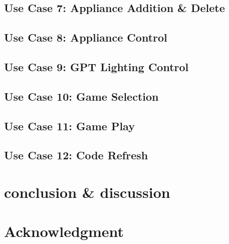 \documentclass[conference]{IEEEtran}
\begin{document}
    \subsection{Use Case 7: Appliance Addition \& Delete}
    \subsection{Use Case 8: Appliance Control}
    \subsection{Use Case 9: GPT Lighting Control}
    \subsection{Use Case 10: Game Selection}
    \subsection{Use Case 11: Game Play}
    \subsection{Use Case 12: Code Refresh}
\section{conclusion \& discussion}

\section*{Acknowledgment}
\end{document}
